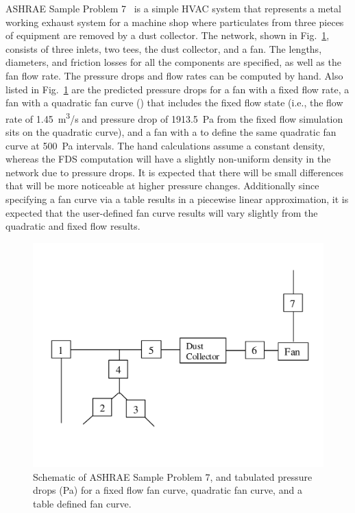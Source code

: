 \documentclass[11pt]{book}
\begin{document}
ASHRAE Sample Problem 7~\cite{ASHRAE} is a simple HVAC system that represents a metal working exhaust system for a machine shop where particulates from three pieces of equipment are removed by a dust collector.  The network, shown in Fig.~\ref{ASHRAE7}, consists of three inlets, two tees, the dust collector, and a fan.  The lengths, diameters, and friction losses for all the components are specified, as well as the fan flow rate. The pressure drops and flow rates can be computed by hand.  Also listed in Fig.~\ref{ASHRAE7} are the predicted pressure drops for a fan with a fixed flow rate, a fan with a quadratic fan curve () that includes the fixed flow state (i.e., the flow rate of 1.45~\si{m^3/s} and pressure drop of 1913.5~Pa from the fixed flow simulation sits on the quadratic curve), and a fan with a  to define the same quadratic fan curve at 500~Pa intervals. The hand calculations assume a constant density, whereas the FDS computation will have a slightly non-uniform density in the network due to pressure drops. It is expected that there will be small differences that will be more noticeable at higher pressure changes.  Additionally since specifying a fan curve via a table results in a piecewise linear approximation, it is expected that the user-defined fan curve results will vary slightly from the quadratic and fixed flow results.


\begin{figure}[ht]
\centering
\includegraphics[width=4.in]{FIGURES/ashrae_7}
\caption[Results of  test cases]{Schematic of ASHRAE Sample Problem 7, and tabulated pressure drops (Pa) for a fixed flow fan curve, quadratic fan curve, and a table defined fan curve.}
\label{ASHRAE7}
\end{figure}
\end{document}
